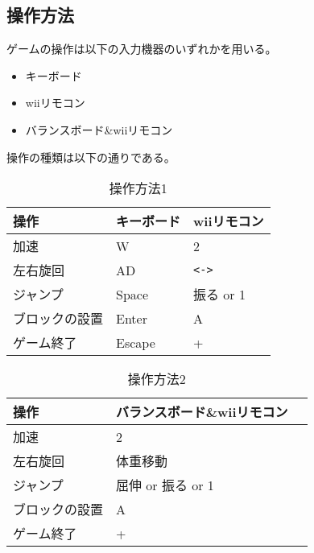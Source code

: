 \documentclass{jarticle}
\begin{document}
\clearpage
\subsection{操作方法}
ゲームの操作は以下の入力機器のいずれかを用いる。
\begin{itemize}
    \item キーボード
    \item wiiリモコン
    \item バランスボード\&wiiリモコン
\end{itemize}

操作の種類は以下の通りである。
\begin{table}[H]
    \caption{操作方法1}
    \label{table:control1}
    \begin{center}
    \begin{tabular}{|l|l|l|}\hline
    操作 & キーボード & wiiリモコン\\ \hline
    加速 & W & 2 \\ \hline
    左右旋回 & AD & \verb+<->+ \\ \hline
    ジャンプ & Space & 振る or 1 \\ \hline
    ブロックの設置 & Enter & A \\ \hline
    ゲーム終了 & Escape& + \\\hline
    
    \end{tabular}
    \end{center}
\end{table}

\begin{table}[H]
    \caption{操作方法2}
    \label{table:control2}
    \begin{center}
    \begin{tabular}{|l|l|l|}\hline
    操作 & バランスボード\&wiiリモコン\\ \hline
    加速 & 2 \\ \hline
    左右旋回 & 体重移動 \\ \hline
    ジャンプ & 屈伸 or 振る or 1 \\ \hline
    ブロックの設置 & A \\ \hline
    ゲーム終了 & + \\\hline
    \end{tabular}
    \end{center}
\end{table}
\end{document}
